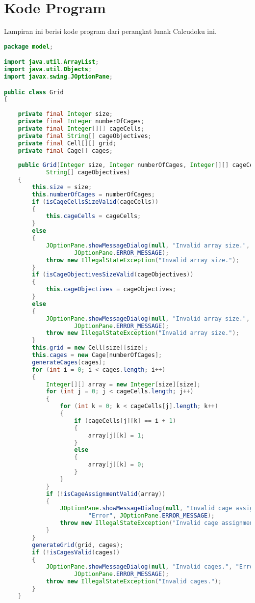 \chapter{Kode Program}
\label{chap:kodeprogram}

Lampiran ini berisi kode program dari perangkat lunak Calcudoku ini.

\singlespacing 

\begin{lstlisting}[language=Java,basicstyle=\tiny,caption=Grid.java]
package model;

import java.util.ArrayList;
import java.util.Objects;
import javax.swing.JOptionPane;

public class Grid
{
    
    private final Integer size;
    private final Integer numberOfCages;
    private final Integer[][] cageCells;
    private final String[] cageObjectives;
    private final Cell[][] grid;
    private final Cage[] cages;
    
    public Grid(Integer size, Integer numberOfCages, Integer[][] cageCells, 
            String[] cageObjectives)
    {
        this.size = size;
        this.numberOfCages = numberOfCages;
        if (isCageCellsSizeValid(cageCells))
        {
            this.cageCells = cageCells;
        }
        else
        { 
            JOptionPane.showMessageDialog(null, "Invalid array size.", "Error", 
                    JOptionPane.ERROR_MESSAGE);
            throw new IllegalStateException("Invalid array size.");
        }
        if (isCageObjectivesSizeValid(cageObjectives))
        {
            this.cageObjectives = cageObjectives;
        }
        else
        {
            JOptionPane.showMessageDialog(null, "Invalid array size.", "Error", 
                    JOptionPane.ERROR_MESSAGE);
            throw new IllegalStateException("Invalid array size.");
        }
        this.grid = new Cell[size][size];
        this.cages = new Cage[numberOfCages];
        generateCages(cages);
        for (int i = 0; i < cages.length; i++)
        {
            Integer[][] array = new Integer[size][size];
            for (int j = 0; j < cageCells.length; j++)
            {
                for (int k = 0; k < cageCells[j].length; k++)
                {
                    if (cageCells[j][k] == i + 1)
                    {
                        array[j][k] = 1;
                    }
                    else
                    {
                        array[j][k] = 0;
                    }
                }
            }
            if (!isCageAssignmentValid(array))
            { 
                JOptionPane.showMessageDialog(null, "Invalid cage assignment.",
                        "Error", JOptionPane.ERROR_MESSAGE);
                throw new IllegalStateException("Invalid cage assignment.");
            }
        }
        generateGrid(grid, cages);
        if (!isCagesValid(cages))
        {
            JOptionPane.showMessageDialog(null, "Invalid cages.", "Error", 
                    JOptionPane.ERROR_MESSAGE);
            throw new IllegalStateException("Invalid cages.");
        }
    }
    

\end{lstlisting}
